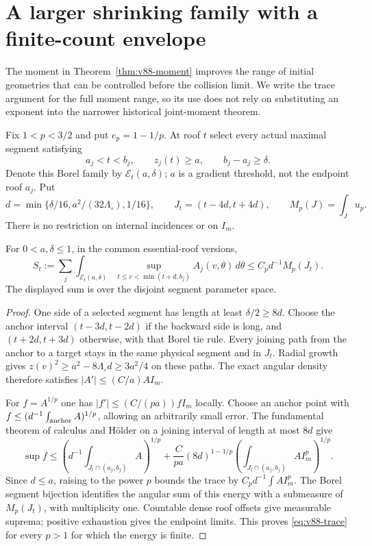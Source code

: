 \section{A larger shrinking family with a finite-count envelope}
\label{sec:v88-envelope}
The moment in Theorem~\ref{thm:v88-moment} improves the range of
initial geometries that can be controlled before the collision limit.
We write the trace argument for the full moment range, so its use does
not rely on substituting an exponent into the narrower historical
joint-moment theorem.

Fix $1<p<3/2$ and put $e_p=1-1/p$. At roof $t$ select every actual
maximal segment satisfying
\[
 a_j<t<b_j,\qquad z_j(t)\ge a,\qquad b_j-a_j\ge\delta.
\]
Denote this Borel family by $\mathcal E_t(a,\delta)$; $a$ is a
gradient threshold, not the endpoint roof $a_j$. Put
\[
 d=\min\{\delta/16,a^2/(32\Lambda_\circ),1/16\},\qquad
 J_t=(t-4d,t+4d),\qquad M_p(J)=\int_Ju_p.
\]
There is no restriction on internal incidences or on $I_m$.

\begin{lemma}
\label{lem:v88-trace}
For $0<a,\delta\le1$, in the common essential-roof versions,
\begin{equation}\label{eq:v88-trace}
 S_t:=\sum_j\int_{\mathcal E_t(a,\delta)}
    \sup_{t\le v<\min(t+d,b_j)}A_j(v,\theta)\,d\theta
                      \le C_p d^{-1}M_p(J_t).
\end{equation}
The displayed sum is over the disjoint segment parameter space.
\end{lemma}
\begin{proof}
One side of a selected segment has length at least $\delta/2\ge8d$.
Choose the anchor interval $(t-3d,t-2d)$ if the backward side is
long, and $(t+2d,t+3d)$ otherwise, with that Borel tie rule.
Every joining path from the anchor to a target stays in the same
physical segment and in $J_t$. Radial growth gives
$z(v)^2\ge a^2-8\Lambda_\circ d\ge3a^2/4$ on these paths.
The exact angular density therefore satisfies $|A'|\le(C/a)AI_m$.

For $f=A^{1/p}$ one has $|f'|\le(C/(pa))fI_m$ locally. Choose
an anchor point with $f\le(d^{-1}\int_{\rm anchor}A)^{1/p}$,
allowing an arbitrarily small error. The fundamental theorem of
calculus and H\"older on a joining interval of length at most $8d$
give
\[
 \sup f\le(d^{-1}\!\int_{J_t\cap(a_j,b_j)}A)^{1/p}
       +\frac C{pa}(8d)^{1-1/p}
                  (\int_{J_t\cap(a_j,b_j)}AI_m^p)^{1/p}.
\]
Since $d\le a$, raising to the power $p$ bounds the trace by
$C_pd^{-1}\int AI_m^p$. The Borel segment bijection identifies
the angular sum of this energy with a submeasure of $M_p(J_t)$,
with multiplicity one. Countable dense roof offsets give measurable
suprema; positive exhaustion gives the endpoint limits. This proves
\eqref{eq:v88-trace} for every $p>1$ for which the energy is finite.
\end{proof}

